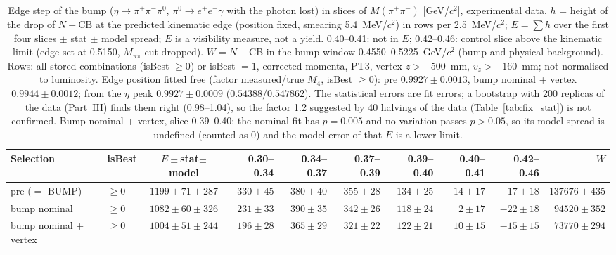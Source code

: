 \begin{table}[H]
\centering\scriptsize
\setlength{\tabcolsep}{2pt}
\caption{Edge step of the bump ($\eta\to\pi^+\pi^-\pi^0$, $\pi^0\to e^+e^-\gamma$ with the photon lost) in slices of $M(\pi^+\pi^-)$ [GeV/$c^2$], experimental data. $h$ = height of the drop of $N-\mathrm{CB}$ at the predicted kinematic edge (position fixed, smearing 5.4~MeV/$c^2$) in rows per 2.5~MeV/$c^2$; $E=\sum h$ over the first four slices $\pm$ stat $\pm$ model spread; $E$ is a visibility measure, not a yield. 0.40--0.41: not in $E$; 0.42--0.46: control slice above the kinematic limit (edge set at 0.5150, $M_{\pi\pi}$ cut dropped). $W=N-\mathrm{CB}$ in the bump window 0.4550--0.5225~GeV/$c^2$ (bump and physical background). Rows: all stored combinations (isBest $\geq0$) or isBest $=1$, corrected momenta, PT3, vertex $z>-500$~mm, $v_z>-160$~mm; not normalised to luminosity. Edge position fitted free (factor measured/true $M_4$, isBest $\geq0$): pre $0.9927\pm0.0013$, bump nominal + vertex $0.9944\pm0.0012$; from the $\eta$ peak $0.9927\pm0.0009$ ($0.54388/0.547862$). The statistical errors are fit errors; a bootstrap with 200 replicas of the data (Part~III) finds them right (0.98--1.04), so the factor 1.2 suggested by 40 halvings of the data (Table~\ref{tab:fix_stat}) is not confirmed. Bump nominal + vertex, slice 0.39--0.40: the nominal fit has $p=0.005$ and no variation passes $p>0.05$, so its model spread is undefined (counted as 0) and the model error of that $E$ is a lower limit.}
\label{tab:res_bump}
\begin{tabular}{llcrrrrrrr}
\toprule
Selection & isBest & $E\pm$stat$\pm$model & 0.30--0.34 & 0.34--0.37 & 0.37--0.39 & 0.39--0.40 & 0.40--0.41 & 0.42--0.46 & $W$ \\
\midrule
pre ($=$ BUMP) & $\geq0$ & $1199\pm71\pm287$ & $330\pm45$ & $380\pm40$ & $355\pm28$ & $134\pm25$ & $14\pm17$ & $17\pm18$ & $137676\pm435$ \\
bump nominal & $\geq0$ & $1082\pm60\pm326$ & $231\pm33$ & $390\pm35$ & $342\pm26$ & $118\pm24$ & $2\pm17$ & $-22\pm18$ & $94520\pm352$ \\
bump nominal + vertex & $\geq0$ & $1004\pm51\pm244$ & $196\pm28$ & $365\pm29$ & $321\pm22$ & $122\pm21$ & $10\pm15$ & $-15\pm15$ & $73770\pm294$ \\

\end{tabular}
\end{table}

